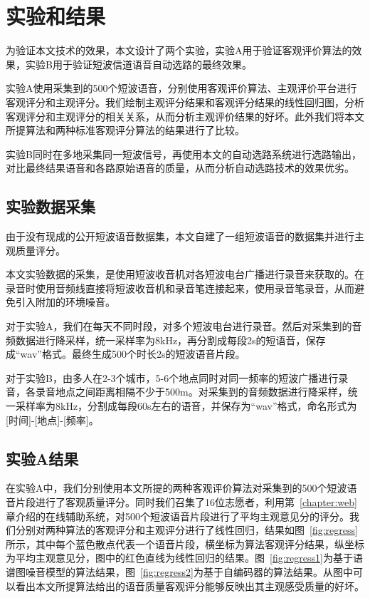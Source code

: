 \chapter{实验和结果}\label{chapter:experiments}

为验证本文技术的效果，本文设计了两个实验，实验A用于验证客观评价算法的效果，实验B用于验证短波信道语音自动选路的最终效果。

实验A使用采集到的500个短波语音，分别使用客观评价算法、主观评价平台进行客观评分和主观评分。我们绘制主观评分结果和客观评分结果的线性回归图，分析客观评分和主观评分的相关关系，从而分析主观评价结果的好坏。此外我们将本文所提算法和两种标准客观评分算法的结果进行了比较。

实验B同时在多地采集同一短波信号，再使用本文的自动选路系统进行选路输出，对比最终结果语音和各路原始语音的质量，从而分析自动选路技术的效果优劣。

\section{实验数据采集}

由于没有现成的公开短波语音数据集，本文自建了一组短波语音的数据集并进行主观质量评分。

本文实验数据的采集，是使用短波收音机对各短波电台广播进行录音来获取的。在录音时使用音频线直接将短波收音机和录音笔连接起来，使用录音笔录音，从而避免引入附加的环境噪音。

对于实验A，我们在每天不同时段，对多个短波电台进行录音。然后对采集到的音频数据进行降采样，统一采样率为8kHz，再分割成每段2s的短语音，保存成“wav”格式。最终生成500个时长2s的短波语音片段。

对于实验B，由多人在2-3个城市，5-6个地点同时对同一频率的短波广播进行录音，各录音地点之间距离相隔不少于500m。对采集到的音频数据进行降采样，统一采样率为8kHz，分割成每段60s左右的语音，并保存为“wav”格式，命名形式为[时间]-[地点]-[频率]。

\section{实验A结果}

在实验A中，我们分别使用本文所提的两种客观评价算法对采集到的500个短波语音片段进行了客观质量评分。同时我们召集了16位志愿者，利用第~\ref{chapter:web}章介绍的在线辅助系统，对500个短波语音片段进行了平均主观意见分的评分。我们分别对两种算法的客观评分和主观评分进行了线性回归，结果如图~\ref{fig:regress}所示，其中每个蓝色散点代表一个语音片段，横坐标为算法客观评分结果，纵坐标为平均主观意见分，图中的红色直线为线性回归的结果。图~\ref{fig:regress1}为基于语谱图噪音模型的算法结果，图~\ref{fig:regress2}为基于自编码器的算法结果。从图中可以看出本文所提算法给出的语音质量客观评分能够反映出其主观感受质量的好坏。

